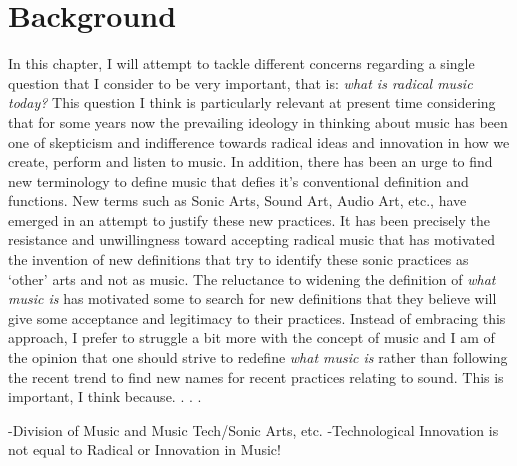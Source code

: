 \chapter{Background}

In this chapter, I will attempt to tackle different concerns regarding a single question that I consider to be very important, that is: \emph{what is radical music today?} This question I think is particularly relevant at present time considering that for some years now the prevailing ideology in thinking about music has been one of skepticism and indifference towards radical ideas and innovation in how we create, perform and listen to music. In addition, there has been an urge to find new terminology to define music that defies it's conventional definition and functions. New terms such as Sonic Arts, Sound Art, Audio Art, etc., have emerged in an attempt to justify these new practices. It has been precisely the resistance and unwillingness toward accepting radical music that has motivated the invention of new definitions that try to identify these sonic practices as `other' arts and not as music. The reluctance to widening the definition of \emph{what music is} has motivated some to search for new definitions that they believe will give some acceptance and legitimacy to their practices. Instead of embracing this approach, I prefer to struggle a bit more with the concept of music and I am of the opinion that one should strive to redefine \emph{what music is} rather than following the recent trend to find new names for recent practices relating to sound. This is important, I think because. . . .

-Division of Music and Music Tech/Sonic Arts, etc.
-Technological Innovation is not equal to Radical or Innovation in Music!



